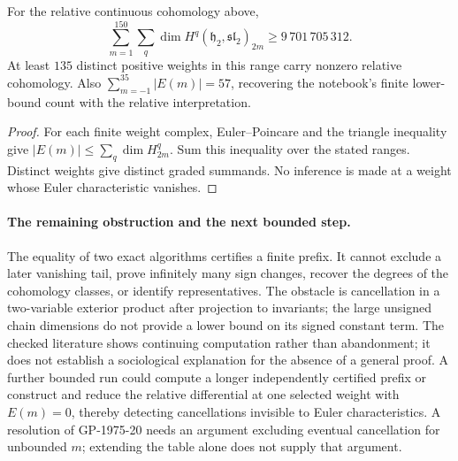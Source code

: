 \begin{corollary}\ours\quad
For the relative continuous cohomology above,
\[
 \sum_{m=1}^{150}\sum_q
    \dim H^q(\mathfrak h_2,\mathfrak{sl}_2)_{2m}
       \geq9\,701\,705\,312.
\]
At least \(135\) distinct positive weights in this range carry nonzero
relative cohomology. Also
\(\sum_{m=-1}^{35}|E(m)|=57\), recovering the notebook's finite
lower-bound count with the relative interpretation.
\end{corollary}
\begin{proof}
For each finite weight complex, Euler--Poincare and the triangle
inequality give \(|E(m)|\leq\sum_q\dim H^q_{2m}\). Sum this inequality
over the stated ranges. Distinct weights give distinct graded summands.
No inference is made at a weight whose Euler characteristic vanishes.
\end{proof}

\paragraph{The remaining obstruction and the next bounded step.}
The equality of two exact algorithms certifies a finite prefix. It cannot
exclude a later vanishing tail, prove infinitely many sign changes,
recover the degrees of the cohomology classes, or identify representatives.
The obstacle is cancellation in a two-variable exterior product after
projection to invariants; the large unsigned chain dimensions do not
provide a lower bound on its signed constant term. The checked literature
shows continuing computation rather than abandonment; it does not
establish a sociological explanation for the absence of a general proof.
A further bounded run could compute a longer independently certified
prefix or construct and reduce the relative differential at one selected
weight with \(E(m)=0\), thereby detecting cancellations invisible to Euler
characteristics. A resolution of GP-1975-20 needs an argument excluding
eventual cancellation for unbounded \(m\); extending the table alone
does not supply that argument.
